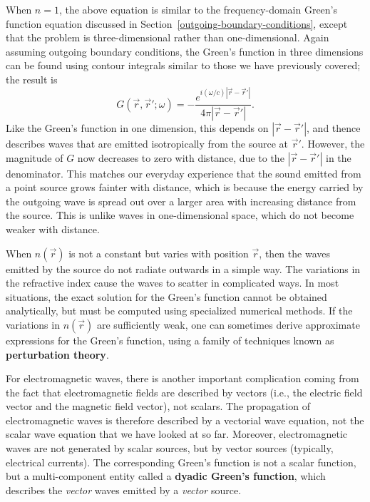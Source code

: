 \documentclass[10pt,a4paper]{article}
\begin{document}
When $n = 1$, the above equation is similar to the frequency-domain
Green's function equation discussed in
Section~\ref{outgoing-boundary-conditions}, except that the problem is
three-dimensional rather than one-dimensional. Again assuming outgoing
boundary conditions, the Green's function in three dimensions can be
found using contour integrals similar to those we have previously
covered; the result is
\begin{equation}
G(\vec{r},\vec{r}';\omega) = -\frac{e^{i(\omega/c)|\vec{r}-\vec{r}'|}}{4\pi|\vec{r}-\vec{r}'|}.
\end{equation}
Like the Green's function in one dimension, this depends on
$|\vec{r}-\vec{r}'|$, and thence describes waves that are emitted
isotropically from the source at $\vec{r}'$. However, the magnitude of
$G$ now decreases to zero with distance, due to the
$|\vec{r}-\vec{r}'|$ in the denominator. This matches our everyday
experience that the sound emitted from a point source grows fainter
with distance, which is because the energy carried by the outgoing
wave is spread out over a larger area with increasing distance from
the source.  This is unlike waves in one-dimensional space, which do
not become weaker with distance.

When $n(\vec{r})$ is not a constant but varies with position
$\vec{r}$, then the waves emitted by the source do not radiate
outwards in a simple way. The variations in the refractive index cause
the waves to scatter in complicated ways. In most situations, the exact
solution for the Green's function cannot be obtained analytically, but
must be computed using specialized numerical methods. If the variations
in $n(\vec{r})$ are sufficiently weak, one can sometimes derive
approximate expressions for the Green's function, using a family of
techniques known as \textbf{perturbation theory}.

For electromagnetic waves, there is another important complication
coming from the fact that electromagnetic fields are described by
vectors (i.e., the electric field vector and the magnetic field vector),
not scalars. The propagation of electromagnetic waves is therefore
described by a vectorial wave equation, not the scalar wave equation
that we have looked at so far. Moreover, electromagnetic waves are not
generated by scalar sources, but by vector sources (typically,
electrical currents). The corresponding Green's function is not a scalar
function, but a multi-component entity called a \textbf{dyadic Green's
function}, which describes the \emph{vector} waves emitted by a
\emph{vector} source.
\end{document}
